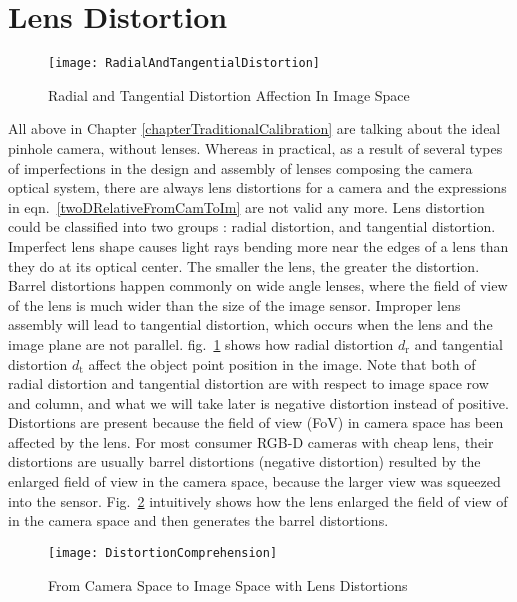 \section{Lens Distortion}
%
\begin{figure}[b]
\centering
\texttt{[image: RadialAndTangentialDistortion]}
\caption{Radial and Tangential Distortion Affection In Image Space}
\label{RadialAndTangentialDistortion}
\end{figure}%
\indent
All above in Chapter \ref{chapterTraditionalCalibration} are talking about the ideal pinhole camera, without lenses. Whereas in practical, as a result of several types of imperfections in the design and assembly of lenses composing the camera optical system, there are always lens distortions for a camera and the expressions in eqn.~\ref{twoDRelativeFromCamToIm} are not valid any more. Lens distortion could be classified into two groups \cite{distortion1_1992} : radial distortion, and tangential distortion. Imperfect lens shape causes light rays bending more near the edges of a lens than they do at its optical center. The smaller the lens, the greater the distortion. Barrel distortions happen commonly on wide angle lenses, where the field of view of the lens is much wider than the size of the image sensor. Improper lens assembly will lead to tangential distortion, which occurs when the lens and the image plane are not parallel. fig.~\ref{RadialAndTangentialDistortion} shows how radial distortion \(d_\text{r}\) and tangential distortion \(d_\text{t}\) affect the object point position in the image. Note that both of radial distortion and tangential distortion are with respect to image space row and column, and what we will take later is negative distortion instead of positive. Distortions are present because the field of view (FoV) in camera space has been affected by the lens. For most consumer RGB-D cameras with cheap lens, their distortions are usually barrel distortions (negative distortion) resulted by the enlarged field  of view in the camera space, because the larger view was squeezed into the sensor. Fig.~\ref{DistortionComprehension} intuitively shows how the lens enlarged the field of view of in the camera space and then generates the barrel distortions.
%
\begin{figure}[t]
\centering
\texttt{[image: DistortionComprehension]}
\caption{From Camera Space to Image Space with Lens Distortions}
\label{DistortionComprehension}
\end{figure}%

